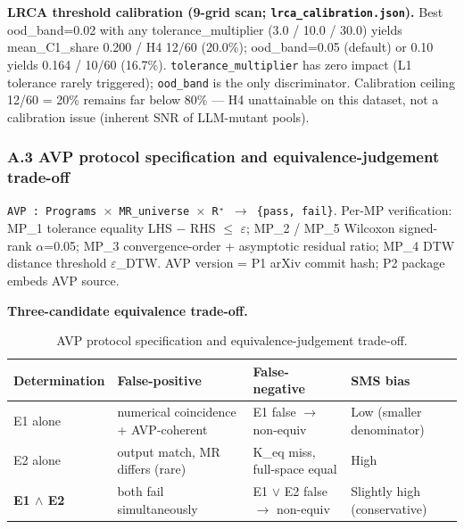 \documentclass[review,12pt,authoryear]{elsarticle}
\begin{document}
\textbf{LRCA threshold calibration (9-grid scan;
\texttt{lrca\_calibration.json}).} Best ood\_band=0.02 with any
tolerance\_multiplier (3.0 / 10.0 / 30.0) yields mean\_C1\_share 0.200 /
H4 12/60 (20.0\%); ood\_band=0.05 (default) or 0.10 yields 0.164 / 10/60
(16.7\%). \texttt{tolerance\_multiplier} has zero impact (L1 tolerance
rarely triggered); \texttt{ood\_band} is the only discriminator.
Calibration ceiling 12/60 = 20\% remains far below 80\% --- H4
unattainable on this dataset, not a calibration issue (inherent SNR of
LLM-mutant pools).

\subsubsection{A.3 AVP protocol specification and equivalence-judgement trade-off}\label{a.3-avp-protocol-specification-and-equivalence-judgement-trade-off}

\texttt{AVP\ :\ Programs\ $\times$\ MR\_universe\ $\times$\ R⁺\ $\to$\ \{pass,\ fail\}}.
Per-MP verification: MP\_1 tolerance equality \textbar LHS −
RHS\textbar{} $\leq$ $\varepsilon$; MP\_2 / MP\_5 Wilcoxon signed-rank $\alpha$=0.05; MP\_3
convergence-order + asymptotic residual ratio; MP\_4 DTW distance
threshold $\varepsilon$\_DTW. AVP version = P1 arXiv commit hash; P2 package embeds
AVP source.

\textbf{Three-candidate equivalence trade-off.}

{\def\LTcaptype{table} %
\begin{longtable}[]{@{}
  >{\raggedright\arraybackslash}p{}
  >{\raggedright\arraybackslash}p{}
  >{\raggedright\arraybackslash}p{}
  >{\raggedright\arraybackslash}p{}@{}}
\caption{AVP protocol specification and equivalence-judgement trade-off.}\label{tab:p2-16}\\
\toprule\noalign{}
\begin{minipage}[b]{\linewidth}\raggedright
Determination
\end{minipage} & \begin{minipage}[b]{\linewidth}\raggedright
False-positive
\end{minipage} & \begin{minipage}[b]{\linewidth}\raggedright
False-negative
\end{minipage} & \begin{minipage}[b]{\linewidth}\raggedright
SMS bias
\end{minipage} \\
\midrule\noalign{}
\endhead
\bottomrule\noalign{}
\endlastfoot
E1 alone & numerical coincidence + AVP-coherent & E1 false $\to$ non-equiv &
Low (smaller denominator) \\
E2 alone & output match, MR differs (rare) & K\_eq miss, full-space
equal & High \\
\textbf{E1 $\wedge$ E2} & both fail simultaneously & E1 $\vee$ E2 false $\to$ non-equiv
& Slightly high (conservative) \\
\end{longtable}
}
\end{document}
